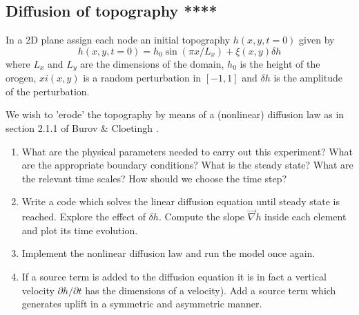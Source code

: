 \subsection{Diffusion of topography ****}

In a 2D plane assign each node an initial topography $h(x,y,t=0)$ given by 
\[
h(x,y,t=0)= h_0 \sin(\pi x/L_x) + \xi(x,y) \delta h
\]
where $L_x$ and $L_y$ are the dimensions of the domain, $h_0$ is the 
height of the orogen, $xi(x,y)$ is a random perturbation in $[-1,1]$
and $\delta h$ is the amplitude of the perturbation.

We wish to 'erode' the topography by means of a (nonlinear) diffusion law
as in section 2.1.1 of Burov \& Cloetingh \cite{bucl97}.

\begin{enumerate}
\item What are the physical parameters needed to carry out this experiment? 
What are the appropriate boundary conditions? 
What is the steady state? What are the relevant time scales? How should we choose the time step?
\item Write a code which solves the linear diffusion equation until steady state is reached.
Explore the effect of $\delta h$. Compute the slope $\vec\nabla h$ inside each element and plot 
its time evolution. 
\item Implement the nonlinear diffusion law and run the model once again. 
\item If a source term is added to the diffusion equation it is in fact a vertical velocity
$\partial h/\partial t$ has the dimensions of a velocity). Add a source term which generates 
uplift in a symmetric and asymmetric manner.  
\end{enumerate}

\Literature  \cite{thsh14} \cite{ster20}  
